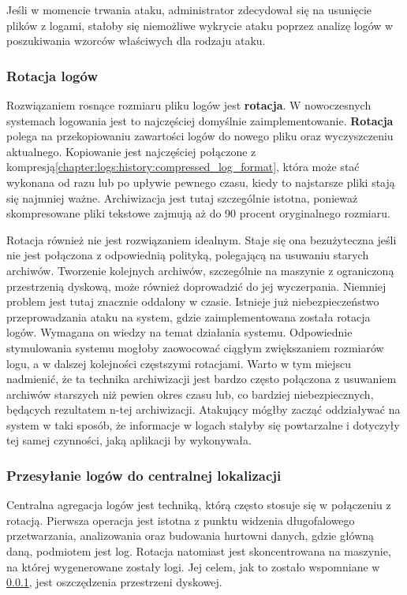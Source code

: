         Jeśli w momencie trwania ataku, administrator zdecydował się na usunięcie plików z logami, stałoby się niemożliwe wykrycie ataku poprzez analizę logów w poszukiwania wzorców właściwych dla rodzaju ataku.
        
        \subsubsection{Rotacja logów}
        \label{logs:collecting:rotation}
        Rozwiązaniem rosnące rozmiaru pliku logów jest \textbf{rotacja}. W nowoczesnych systemach logowania
        jest to najczęściej domyślnie zaimplementowanie. \textbf{Rotacja} polega na przekopiowaniu 
        zawartości logów do nowego pliku oraz wyczyszczeniu aktualnego. Kopiowanie jest najczęściej połączone
        z kompresją\ref{chapter:logs:history:compressed_log_format}, która może stać wykonana od razu lub po upływie pewnego czasu, kiedy to najstarsze
        pliki stają się najmniej ważne. Archiwizacja jest tutaj szczególnie istotna, ponieważ
        skompresowane pliki tekstowe zajmują aż do 90 procent oryginalnego rozmiaru.
        
        Rotacja również nie jest rozwiązaniem idealnym. Staje się ona bezużyteczna jeśli nie jest połączona
        z odpowiednią polityką, polegającą na usuwaniu starych archiwów. Tworzenie kolejnych archiwów,
        szczególnie na maszynie z ograniczoną przestrzenią dyskową, może również doprowadzić do jej wyczerpania.
        Niemniej problem jest tutaj znacznie oddalony w czasie. Istnieje już niebezpieczeństwo przeprowadzania
        ataku na system, gdzie zaimplementowana została rotacja logów. Wymagana on wiedzy na temat działania systemu.
        Odpowiednie stymulowania systemu mogłoby zaowocować ciągłym zwiększaniem rozmiarów logu, a w dalszej kolejności
        częstszymi rotacjami. Warto w tym miejscu nadmienić, że ta technika archiwizacji jest bardzo często
        połączona z usuwaniem archiwów starszych niż pewien okres czasu lub, co bardziej niebezpiecznych, będących
        rezultatem n-tej archiwizacji. Atakujący mógłby zacząć oddziaływać na system w taki sposób, że informacje
        w logach stałyby się powtarzalne i dotyczyły tej samej czynności, jaką aplikacji by wykonywała.
        
        \subsubsection{Przesyłanie logów do centralnej lokalizacji}
        \label{logs:collecting:central_location}
        Centralna agregacja logów jest techniką, którą często stosuje się w połączeniu z rotacją.
        Pierwsza operacja jest istotna z punktu widzenia długofalowego przetwarzania, analizowania oraz
        budowania hurtowni danych, gdzie główną daną, podmiotem jest log. Rotacja natomiast jest skoncentrowana
        na maszynie, na której wygenerowane zostały logi. Jej celem, jak to zostało wspomniane w \ref{logs:collecting:rotation},
        jest oszczędzenia przestrzeni dyskowej.
    